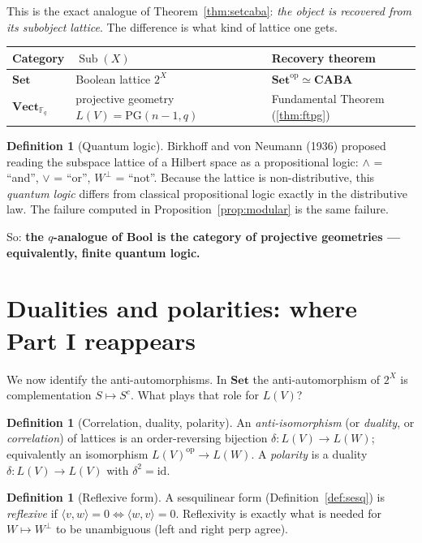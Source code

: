 \documentclass[11pt,a4paper]{article}
\theoremstyle{definition}
\newtheorem{definition}[theorem]{Definition}
\theoremstyle{remark}
\newcommand{\FF}{\mathbb{F}}
\newcommand{\ip}[2]{\langle #1, #2 \rangle}
\newcommand{\perpp}{^{\perp}}
\newcommand{\cat}[1]{\mathbf{#1}}
\newcommand{\Set}{\cat{Set}}
\newcommand{\Bool}{\cat{Bool}}
\newcommand{\CABA}{\cat{CABA}}
\newcommand{\Vect}{\cat{Vect}}
\newcommand{\PG}{\mathrm{PG}}
\newcommand{\op}{\mathrm{op}}
\DeclareMathOperator{\Sub}{Sub}
\begin{document}
This is the exact analogue of Theorem~\ref{thm:setcaba}: \emph{the object is recovered from
its subobject lattice}. The difference is what kind of lattice one gets.

\begin{center}
\begin{tabular}{lll}
\toprule
Category & $\Sub(X)$ & Recovery theorem \\
\midrule
$\Set$ & Boolean lattice $2^{X}$ & $\Set^{\op} \simeq \CABA$ \\
$\Vect_{\FF_q}$ & projective geometry $L(V) = \PG(n{-}1,q)$ & Fundamental Theorem (\ref{thm:ftpg}) \\
\bottomrule
\end{tabular}
\end{center}

\begin{definition}[Quantum logic]
Birkhoff and von Neumann (1936) proposed reading the subspace lattice of a Hilbert space as a
propositional logic: $\wedge$ = ``and'', $\vee$ = ``or'', $W\perpp$ = ``not''. Because the
lattice is non-distributive, this \emph{quantum logic} differs from classical propositional
logic exactly in the distributive law. The failure computed in
Proposition~\ref{prop:modular} is the same failure.
\end{definition}

\noindent
So: \textbf{the $q$-analogue of $\Bool$ is the category of projective geometries ---
equivalently, finite quantum logic.}

\section{Dualities and polarities: where Part I reappears}

We now identify the anti-automorphisms. In $\Set$ the anti-automorphism of $2^{X}$ is
complementation $S \mapsto S^{c}$. What plays that role for $L(V)$?

\begin{definition}[Correlation, duality, polarity]
An \emph{anti-isomorphism} (or \emph{duality}, or \emph{correlation}) of lattices is an
order-reversing bijection $\delta : L(V) \to L(W)$; equivalently an isomorphism
$L(V)^{\op} \to L(W)$. A \emph{polarity} is a duality $\delta : L(V) \to L(V)$ with
$\delta^{2} = \mathrm{id}$.
\end{definition}

\begin{definition}[Reflexive form]
A sesquilinear form (Definition~\ref{def:sesq}) is \emph{reflexive} if
$\ip{v}{w} = 0 \iff \ip{w}{v} = 0$. Reflexivity is exactly what is needed for
$W \mapsto W\perpp$ to be unambiguous (left and right perp agree).
\end{definition}
\end{document}
